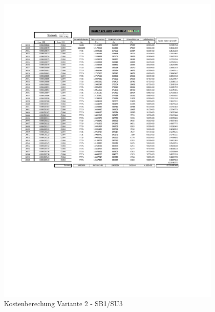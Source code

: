 \begin{figure}[h!]
	\centering
	\includegraphics[width=\textwidth]{figures/Anhang/f-00-A-V2-B1-U3}
	\caption{Kostenberechung Variante 2 - SB1/SU3}
\end{figure}

